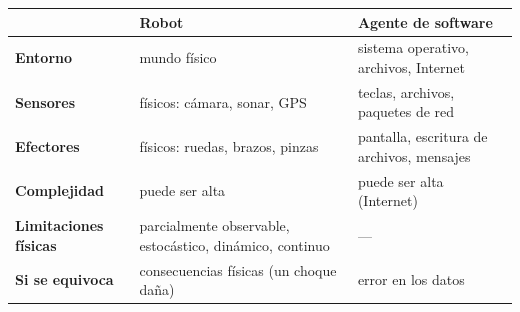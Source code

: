 \documentclass[11pt,a4paper]{article}
\begin{document}
\begin{center}
\small
\begin{tabularx}{\linewidth}{@{}>{\bfseries}l X X@{}}
\toprule
 & \textbf{Robot} & \textbf{Agente de software} \\
\midrule
Entorno & mundo físico & sistema operativo, archivos, Internet \\
Sensores & físicos: cámara, sonar, GPS & teclas, archivos, paquetes de red \\
Efectores & físicos: ruedas, brazos, pinzas & pantalla, escritura de archivos, mensajes \\
Complejidad & puede ser alta & puede ser alta (Internet) \\
Limitaciones físicas & parcialmente observable, estocástico, dinámico, continuo & --- \\
Si se equivoca & consecuencias físicas (un choque daña) & error en los datos \\
\bottomrule
\end{tabularx}
\end{center}
\end{document}
